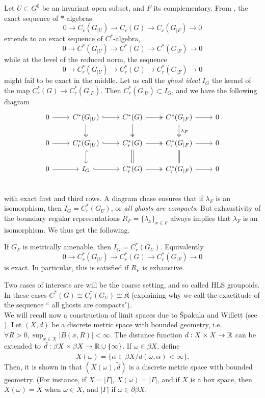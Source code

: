 Let $U\subset G^0$ be an invariant open subset, and $F$ its complementary. From \cite{Renault}, the exact sequence of $*$-algebras 
\[0\rightarrow C_c(G_{|U}) \rightarrow C_c(G)\rightarrow C_c(G_{|F})\rightarrow 0\]  
extends to an exact sequence of $C^*$-algebra,
\[0\rightarrow C^*(G_{|U}) \rightarrow C^*(G)\rightarrow C^*(G_{|F})\rightarrow 0\]
while at the level of the reduced norm, the sequence 
\[0\rightarrow C_r^*(G_{|U}) \rightarrow C_r^*(G)\rightarrow C_r^*(G_{|F})\rightarrow 0\]
might fail to be exact in the middle. Let us call the \textit{ghost ideal} $I_G$ the kernel of the map $C^*_r(G)\rightarrow C^*_r(G_{|F})$. Then $C^*_r(G_{|U}) \subset I_G$, and we have the following diagram
\[\begin{tikzcd}
0 \arrow{r} &  C^*(G_{|U}) \arrow[r,hook] \arrow[d, two heads] & C^*(G)\arrow[r, two heads] \arrow[d, two heads] & C^*(G_{|F})\arrow{r} \arrow[d, two heads, "\lambda_F" ] & 0 \\
0 \arrow{r} &  C_r^*(G_{|U})\arrow[r,hook] \arrow[d,hook] & C_r^*(G)\arrow[r, two heads]  \arrow[d,equal] & C_r^*(G_{|F})\arrow{r} \arrow[d,equal] & 0 \\
0 \arrow{r} &  I_G \arrow[r,hook] & C_r^*(G)\arrow[r, two heads] & C_r^*(G_{|F})\arrow{r} & 0 \\
\end{tikzcd}\]
with exact first and third rows. A diagram chase ensures that if $\lambda_F$ is an isomorphism, then $I_G=C^*_r(G_U)$, or \textit{all ghosts are compacts}. But exhaustivity of the boundary regular representations $R_F=\{\lambda_x\}_{x\in F}$ always implies that $\lambda_F$ is an isomorphism. We thus get the following.

\begin{prop}
If $G_F$ is metrically amenable, then $I_G=C^*_r(G_U)$. Equivalently
\[0\rightarrow C_r^*(G_{|U}) \rightarrow C_r^*(G)\rightarrow C_r^*(G_{|F})\rightarrow 0\]
is exact. In particular, this is satisfied if $R_F$ is exhaustive.
\end{prop} 

Two cases of interests are will be the coarse setting, and so called HLS groupoids. In these cases $C^*(G) \cong C^*_r(G_U) \cong \mathfrak K$ (explaining why we call the exactitude of the sequence `` all ghosts are compacts"). \\

We will recall now a construction of limit spaces due to \v{S}pakula and Willett (see \cite{vspakula2017metric}). Let $(X,d)$ be a discrete metric space with bounded geometry, i.e. $\forall R>0, \sup_{x\in X} |B(x,R)| < \infty$. The distance function $d: X\times X \rightarrow \mathbb R$ can be extended to $\tilde d: \beta X \times \beta X \rightarrow \mathbb R \cup \{\infty\}$. If $\omega \in \beta X$, define 
\[X(\omega) = \{\alpha \in \beta X / \tilde d (\omega , \alpha ) < \infty\}.\]
Then, it is shown in \cite{SpakulaWillett} that $(X(\omega), \tilde d)$ is a discrete metric space with bounded geometry. (For instance, if $X=|\Gamma|$, $X(\omega)=|\Gamma | $, and if $X$ is a box space, then $X(\omega) = X$ when $\omega \in X$, and $|\Gamma|$ if $\omega\in \partial \beta X$.\\

